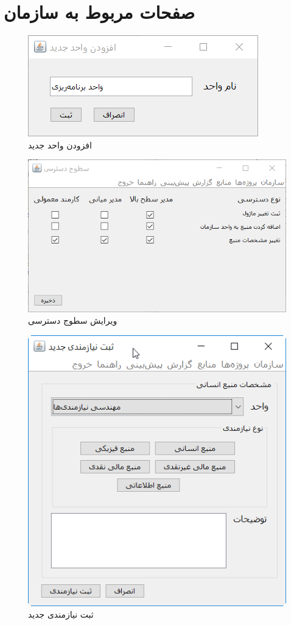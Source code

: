 \section{صفحات مربوط به سازمان}
\begin{figure}[H]
	\centering
	\includegraphics[scale=0.8]{img/prot/AddUnit}
	\caption{افزودن واحد جدید}
\end{figure}
\begin{figure}[H]
	\centering
	\includegraphics[scale=0.8]{img/prot/EditAccessPermissions}
	\caption{ویرایش سطوج دسترسی}
\end{figure}
\begin{figure}[H]
	\centering
	\includegraphics[scale=0.8]{img/prot/SubmitNewRequirement}
	\caption{ثبت نیازمندی جدید}
\end{figure}
